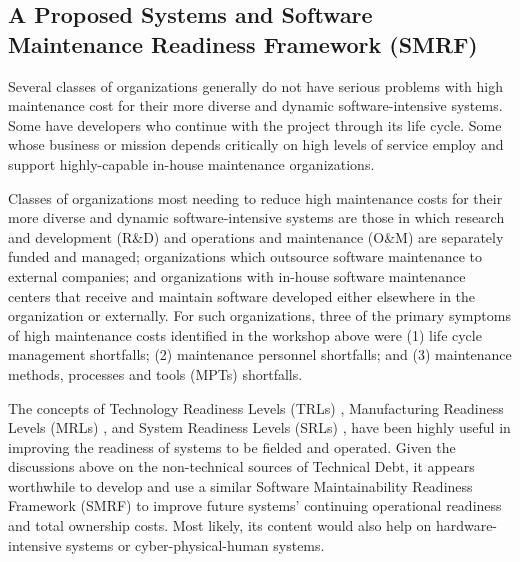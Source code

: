 \subsection{A Proposed Systems and Software Maintenance Readiness Framework (SMRF)}
\label{subsec:smrf}
Several classes of organizations generally do not have serious problems with high maintenance cost for their more diverse and dynamic software-intensive systems. Some have developers who continue with the project through its life cycle. Some whose business or mission depends critically on high levels of service employ and support highly-capable in-house maintenance organizations.

Classes of organizations most needing to reduce high maintenance costs for their more diverse and dynamic software-intensive systems are those in which research and development (R\&D) and operations and maintenance (O\&M) are separately funded and managed; organizations which outsource software maintenance to external companies; and organizations with in-house software maintenance centers that receive and maintain software developed either elsewhere in the organization or externally. For such organizations, three of the primary symptoms of high maintenance costs
identified in the workshop above were
(1) life cycle management shortfalls; (2) maintenance personnel shortfalls; and (3) maintenance methods, processes and tools (MPTs) shortfalls.



The concepts of Technology Readiness Levels (TRLs) \cite{dod2011technology}, Manufacturing Readiness Levels (MRLs) \cite{cundiff2003manufacturing}, and System Readiness Levels (SRLs) \cite{sauser2006trl,sauser2007system}, have been highly useful in improving the readiness of systems to be fielded and operated.  Given the discussions above on the non-technical sources of Technical Debt, it appears worthwhile to develop and use a similar Software Maintainability Readiness Framework (SMRF) to improve future systems' continuing operational readiness and total ownership costs. Most likely, its content would also help on hardware-intensive systems or cyber-physical-human systems.




